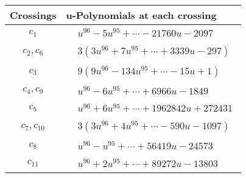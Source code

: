 \documentclass[1p]{elsarticle_modified}
\theoremstyle{definition}
\begin{document}
\begin{tabular}{m{50pt}|m{274pt}}
Crossings & \hspace{64pt}u-Polynomials at each crossing \\
\hline $$\begin{aligned}c_{1}\end{aligned}$$&$\begin{aligned}
&u^{96}-5 u^{95}+\cdots-21760 u-2097
\end{aligned}$\\
\hline $$\begin{aligned}c_{2},c_{6}\end{aligned}$$&$\begin{aligned}
&3(3 u^{96}+7 u^{95}+\cdots+3339 u-297)
\end{aligned}$\\
\hline $$\begin{aligned}c_{3}\end{aligned}$$&$\begin{aligned}
&9(9 u^{96}-134 u^{95}+\cdots-15 u+1)
\end{aligned}$\\
\hline $$\begin{aligned}c_{4},c_{9}\end{aligned}$$&$\begin{aligned}
&u^{96}-6 u^{95}+\cdots+6966 u-1849
\end{aligned}$\\
\hline $$\begin{aligned}c_{5}\end{aligned}$$&$\begin{aligned}
&u^{96}+6 u^{95}+\cdots+1962842 u+272431
\end{aligned}$\\
\hline $$\begin{aligned}c_{7},c_{10}\end{aligned}$$&$\begin{aligned}
&3(3 u^{96}+4 u^{95}+\cdots-590 u-1097)
\end{aligned}$\\
\hline $$\begin{aligned}c_{8}\end{aligned}$$&$\begin{aligned}
&u^{96}- u^{95}+\cdots+56419 u-24573
\end{aligned}$\\
\hline $$\begin{aligned}c_{11}\end{aligned}$$&$\begin{aligned}
&u^{96}+2 u^{95}+\cdots+89272 u-13803
\end{aligned}$\\
\hline
\end{tabular}\\~\\
\end{document}
